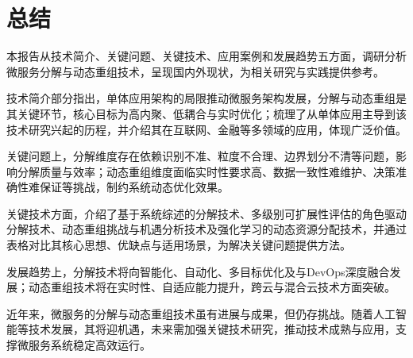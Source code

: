 \documentclass[lang=cn,11pt,a4paper,cite=number]{elegantpaper}
\begin{document}
\section{总结}
\label{sec:x1}
本报告从技术简介、关键问题、关键技术、应用案例和发展趋势五方面，调研分析微服务分解与动态重组技术，呈现国内外现状，为相关研究与实践提供参考。\par
技术简介部分指出，单体应用架构的局限推动微服务架构发展，分解与动态重组是其关键环节，核心目标为高内聚、低耦合与实时优化；梳理了从单体应用主导到该技术研究兴起的历程，并介绍其在互联网、金融等多领域的应用，体现广泛价值。\par
关键问题上，分解维度存在依赖识别不准、粒度不合理、边界划分不清等问题，影响分解质量与效率；动态重组维度面临实时性要求高、数据一致性难维护、决策准确性难保证等挑战，制约系统动态优化效果。\par
关键技术方面，介绍了基于系统综述的分解技术、多级别可扩展性评估的角色驱动分解技术、动态重组挑战与机遇分析技术及强化学习的动态资源分配技术，并通过表格对比其核心思想、优缺点与适用场景，为解决关键问题提供方法。\par
发展趋势上，分解技术将向智能化、自动化、多目标优化及与DevOps深度融合发展；动态重组技术将在实时性、自适应能力提升，跨云与混合云技术方面突破。\par
近年来，微服务的分解与动态重组技术虽有进展与成果，但仍存挑战。随着人工智能等技术发展，其将迎机遇，未来需加强关键技术研究，推动技术成熟与应用，支撑微服务系统稳定高效运行。
\newpage

\end{document}
